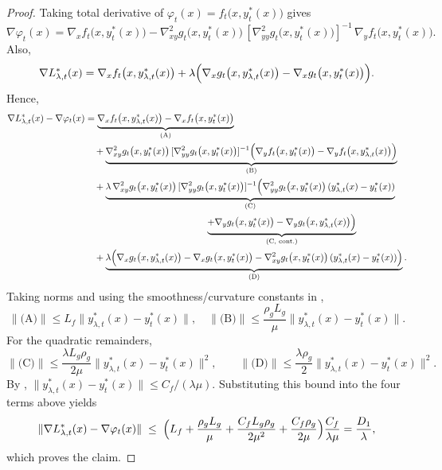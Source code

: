 \documentclass{uai2026} %
\begin{document}
\begin{proof}
Taking total derivative of $\varphi_{t}(x)=f_{t}\bigl(x,y^*_{t}(x)\bigr)$ gives
\[
\nabla \varphi_{t}(x)
= \nabla_x f_{t}\bigl(x,y^*_{t}(x)\bigr)
- \nabla^2_{xy} g_{t}\bigl(x,y^*_{t}(x)\bigr)\,[\nabla^2_{yy} g_{t}\bigl(x,y^*_{t}(x)\bigr)]^{-1}\,\nabla_y f_{t}\bigl(x,y^*_{t}(x)\bigr).
\]
Also,
\[
\nabla L^*_{\lambda,t}(x)
= \nabla_x f_{t}\bigl(x,y^*_{\lambda,t}(x)\bigr)
+ \lambda\Bigl(\nabla_x g_{t}\bigl(x,y^*_{\lambda,t}(x)\bigr) - \nabla_x g_{t}\bigl(x,y^*_{t}(x)\bigr)\Bigr).
\]
Hence,
\begin{align*}
\nabla L^*_{\lambda,t}(x) - \nabla \varphi_{t}(x)
&= \underbrace{\nabla_x f_{t}\bigl(x,y^*_{\lambda,t}(x)\bigr) - \nabla_x f_{t}\bigl(x,y^*_{t}(x)\bigr)}_{\text{(A)}} \\
&\quad + \underbrace{\nabla^2_{xy} g_{t}\bigl(x,y^*_{t}(x)\bigr)\,[\nabla^2_{yy} g_{t}\bigl(x,y^*_{t}(x)\bigr)]^{-1}\Bigl(\nabla_y f_{t}\bigl(x,y^*_{t}(x)\bigr)-\nabla_y f_{t}\bigl(x,y^*_{\lambda,t}(x)\bigr)\Bigr)}_{\text{(B)}} \\
&\quad + \underbrace{\lambda\,\nabla^2_{xy} g_{t}\bigl(x,y^*_{t}(x)\bigr)\,[\nabla^2_{yy} g_{t}\bigl(x,y^*_{t}(x)\bigr)]^{-1} \Bigl(\nabla^2_{yy} g_{t}\bigl(x,y^*_{t}(x)\bigr)\,(y^*_{\lambda,t}(x)-y^*_{t}(x))}_{\text{(C)}}\\
&\qquad\qquad\quad \qquad\qquad\qquad\qquad\underbrace{ + \nabla_y g_{t}\bigl(x,y^*_{t}(x)\bigr) - \nabla_y g_{t}\bigl(x,y^*_{\lambda,t}(x)\bigr)\Bigr)}_{\text{(C, cont.)}} \\
&\quad + \underbrace{\lambda\Bigl(\nabla_x g_{t}\bigl(x,y^*_{\lambda,t}(x)\bigr)-\nabla_x g_{t}\bigl(x,y^*_{t}(x)\bigr) - \nabla^2_{xy} g_{t}\bigl(x,y^*_{t}(x)\bigr)\,(y^*_{\lambda,t}(x)-y^*_{t}(x))\Bigr)}_{\text{(D)}}.
\end{align*}
Taking norms and using the smoothness/curvature constants in ,
\[
\|\text{(A)}\| \le L_f\|y^*_{\lambda,t}(x)-y^*_{t}(x)\|,\quad
\|\text{(B)}\| \le \frac{\rho_g L_g}{\mu}\|y^*_{\lambda,t}(x)-y^*_{t}(x)\|.
\]
For the quadratic remainders,
\[
\|\text{(C)}\| \le \frac{\lambda L_g \rho_g}{2\mu}\|y^*_{\lambda,t}(x)-y^*_{t}(x)\|^2,\qquad
\|\text{(D)}\| \le \frac{\lambda \rho_g}{2}\|y^*_{\lambda,t}(x)-y^*_{t}(x)\|^2.
\]
By , $\|y^*_{\lambda,t}(x)-y^*_{t}(x)\|\le C_f/(\lambda\mu)$. Substituting this bound into the
four terms above yields
\[
\|\nabla L^*_{\lambda,t}(x) - \nabla \varphi_{t}(x)\|
\;\le\;
\Bigl(
L_f + \frac{\rho_g L_g}{\mu}
+ \frac{C_f L_g \rho_g}{2\mu^2}
+ \frac{C_f \rho_g}{2\mu}
\Bigr)\frac{C_f}{\lambda\mu}
= \frac{D_1}{\lambda},
\]
which proves the claim.
\end{proof}
\end{document}
